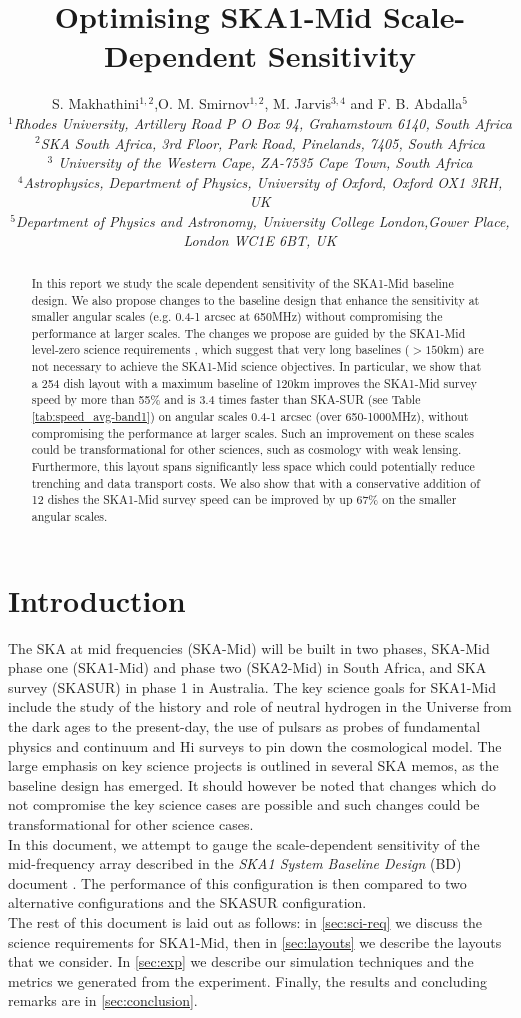 \documentclass[sfheadings,a4paper,times,9pt,floats,floatfix]{article}
\title{Optimising SKA1-Mid Scale-Dependent Sensitivity}
\author{S. Makhathini$^{1,2}$,O. M. Smirnov$^{1,2}$, M. Jarvis$^{3,4}$ and F. B. Abdalla$^5$ \\{\footnotesize \it $^1$Rhodes
University, Artillery Road P O Box 94, Grahamstown 6140, South Africa} \\{ \footnotesize \it $^2$SKA South Africa, 3rd Floor,
Park Road, Pinelands, 7405, South Africa} \\{\footnotesize \it $^3$ University of the Western Cape, ZA-7535 Cape Town, South
Africa}\\ {\footnotesize \it $^4$Astrophysics, Department of Physics, University of Oxford, Oxford OX1 3RH, UK} \\ {\footnotesize \it $^5$Department of Physics
and Astronomy, University College London,Gower Place, London WC1E 6BT, UK}}
\begin{document}
\maketitle
\begin{abstract}
In this report we study the scale dependent sensitivity of the SKA1-Mid baseline design. We also propose changes to the baseline
design that enhance the sensitivity at smaller angular scales (e.g. 0.4-1 arcsec at 650MHz) without compromising the performance
at larger scales. The changes we propose are guided by the SKA1-Mid level-zero science requirements \cite{srd}, which suggest that
very long baselines ($>150$km) are not necessary to achieve the SKA1-Mid science objectives. In particular, we show that a 254
dish layout with a maximum baseline of 120km improves the SKA1-Mid survey speed by more than 55\% and is 3.4 times faster than
SKA-SUR (see Table \ref{tab:speed_avg-band1}) on angular scales 0.4-1 arcsec (over 650-1000MHz), without compromising the
performance
at larger scales. Such an improvement on these scales could be transformational for other sciences, such as cosmology with weak
lensing. Furthermore, this layout spans significantly less space which could potentially reduce trenching and data transport
costs. We also show that with a conservative addition of 12 dishes the SKA1-Mid survey speed can be improved by up 67\% on the
smaller angular scales.
\end{abstract}
\section{Introduction}
The SKA at mid frequencies (SKA-Mid) will be built in two phases, SKA-Mid phase one (SKA1-Mid) and phase two (SKA2-Mid)
in South Africa, and SKA survey (SKASUR) in phase 1 in Australia. The key science goals for SKA1-Mid include the study of the
history and role of neutral hydrogen in the Universe from the dark ages to the present-day, the use of pulsars as probes of
fundamental physics \cite{bd} and continuum and H{\sc i} surveys to pin down the cosmological model. The large emphasis on key
science projects is outlined in several SKA memos, as the baseline design has emerged. It should however be noted that changes
which do not compromise the key science cases are possible and such changes could be transformational for other science 
cases. \\ In this document, we attempt to gauge the scale-dependent sensitivity of the mid-frequency array
described in the {\it SKA1 System Baseline Design} (BD) document \cite{bd}. The performance of this configuration is then compared
to two alternative configurations and the SKASUR configuration.\\
The rest of this document is laid out as follows: in \autoref{sec:sci-req} we discuss the science requirements for SKA1-Mid, then
in \autoref{sec:layouts} we describe the layouts that we consider. In \autoref{sec:exp} we describe our simulation
techniques and the metrics we generated from the experiment. Finally, the results and concluding remarks are in
\autoref{sec:conclusion}.
\end{document}
